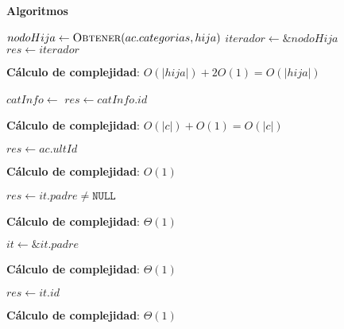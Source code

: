 \documentclass[10pt, a4paper]{article}
\let\TipoVariable=\texttt
\let\ModificadorArgumento=\textbf
\newcommand{\In}[2]{\ModificadorArgumento{in} \ensuremath{#1}\,: \TipoVariable{#2}\xspace}
\newcommand{\Inout}[2]{\ModificadorArgumento{in/out} \ensuremath{#1}\,: \TipoVariable{#2}\xspace}
\newenvironment{Servicios Usados}{%
  \vspace*{2ex}
  \noindent\textbf{\Large Servicios Usados}%
  \vspace*{2ex}
}{}
\newenvironment{Algoritmos}{%
  \vspace*{2ex}%
  \noindent\textbf{\Large Algoritmos}%
  \vspace*{2ex}%
}{}
\newenvironment{Algoritmos Del Iterador}{%
  \vspace*{2ex}%
  \noindent\textbf{\Large Algoritmos Del Iterador}%
  \vspace*{2ex}%
}{}
\newcommand{\DRef}{\ensuremath{\rightarrow}}
\begin{document}
\begin{Algoritmos}
\begin{algorithm}[H]
\caption*{iPadres(\In{ac}{abCat}, \In{hija}{categoria}) $\DRef res$ : \TipoVariable{itabCat}}
\begin{algorithmic}[1]
    \State $nodoHija \gets \Call{Obtener}{ac.categorias, hija}$
    \State $iterador \gets \&nodoHija$
    \State $res \gets iterador$
\end{algorithmic}
\textbf{C\'alculo de complejidad}: $O(|hija|) + 2O(1) = O(|hija|)$
\end{algorithm}

\begin{algorithm}[H]
\caption*{iID(\In{ac}{abCat}, \In{c}{categoria}) $\DRef res$ : \TipoVariable{Nat}}
\begin{algorithmic}[1]
	\State $catInfo \gets$ 
	\State $res \gets catInfo.id$
\end{algorithmic}
\textbf{C\'alculo de complejidad}: $O(|c|) + O(1) = O(|c|)$
\end{algorithm}

\begin{algorithm}[H]
\caption*{iCantCategorias(\In{ac}{abCat}) $\DRef res$ : \TipoVariable{Nat}}
\begin{algorithmic}[1]
	\State $res \gets ac.ultId$
\end{algorithmic}
\textbf{C\'alculo de complejidad}: $O(1)$
\end{algorithm}

\end{Algoritmos}

\begin{Algoritmos Del Iterador}

\begin{algorithm}[H]
\caption*{iHayMasPadres?(\In{it}{itabCat}) $\DRef res$ : \TipoVariable{Bool}}
\begin{algorithmic}[1]
	\State $res \gets it.padre \neq \TipoVariable{NULL}$
\end{algorithmic}
	\textbf{C\'alculo de complejidad}: $\Theta(1)$
\end{algorithm}

\begin{algorithm}[H]
\caption*{iSubir(\Inout{it}{itabCat})}
\begin{algorithmic}[1]
	\State $it \gets \&it.padre$ 
\end{algorithmic}
	\textbf{C\'alculo de complejidad}: $\Theta(1)$
\end{algorithm}

\begin{algorithm}[H]
\caption*{iActualID(\In{it}{itabCat}) $\DRef res$ : {$Nat$}}
\begin{algorithmic}[1]
	\State $res \gets it.id$ 
\end{algorithmic}
	\textbf{C\'alculo de complejidad}: $\Theta(1)$
\end{algorithm}

\end{Algoritmos Del Iterador}
\end{document}
